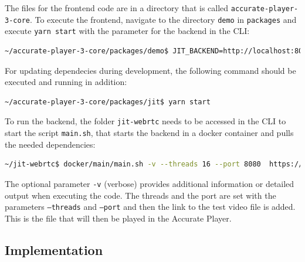 \documentclass[../MasterThesis.tex]{subfiles}
\begin{document}
The files for the frontend code are in a directory that is called \texttt{accurate-player-3-core}. To execute the frontend, navigate to the directory \texttt{demo} in \texttt{packages} and execute \texttt{yarn start} with the parameter for the backend in the CLI:
\begin{lstlisting}[language=bash, numbers=none]
 ~/accurate-player-3-core/packages/demo$ JIT_BACKEND=http://localhost:8080 yarn start
\end{lstlisting}

For updating dependecies during development, the following command should be executed and running in addition: 
\begin{lstlisting}[language=bash, numbers=none]
	~/accurate-player-3-core/packages/jit$ yarn start
\end{lstlisting}


To run the backend, the folder \texttt{jit-webrtc} needs to be accessed in the CLI to start the script \texttt{main.sh}, that starts the backend in a docker container and pulls the needed dependencies:
\begin{lstlisting}[language=bash, numbers=none]
 ~/jit-webrtc$ docker/main/main.sh -v --threads 16 --port 8080  https://s3.eu-central-1.amazonaws.com/accurate-player-demo-assets/timecode/sintel-2048-timecode-stereo.mp4
\end{lstlisting}

The optional parameter \texttt{-v} (verbose) provides additional information or detailed output when executing the code. The threads and the port are set with the parameters \texttt{--threads} and \texttt{--port} and then the link to the test video file is added. This is the file that will then be played in the Accurate Player.


















\subsection{Implementation} \label{subsection:implementation}
\end{document}
